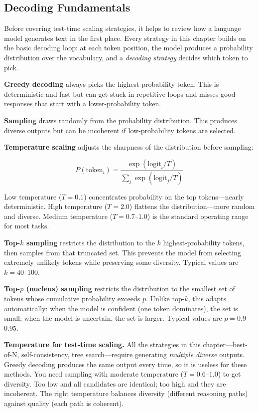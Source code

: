 \begin{chapterenv}
\section{Decoding Fundamentals}

Before covering test-time scaling strategies, it helps to review how a language model generates text in the first place. Every strategy in this chapter builds on the basic decoding loop: at each token position, the model produces a probability distribution over the vocabulary, and a \textit{decoding strategy} decides which token to pick.

\textbf{Greedy decoding} always picks the highest-probability token. This is deterministic and fast but can get stuck in repetitive loops and misses good responses that start with a lower-probability token.

\textbf{Sampling} draws randomly from the probability distribution. This produces diverse outputs but can be incoherent if low-probability tokens are selected.

\textbf{Temperature scaling} adjusts the sharpness of the distribution before sampling:

$$P(\text{token}_i) = \frac{\exp(\text{logit}_i / T)}{\sum_j \exp(\text{logit}_j / T)}$$

Low temperature ($T = 0.1$) concentrates probability on the top tokens---nearly deterministic. High temperature ($T = 2.0$) flattens the distribution---more random and diverse. Medium temperature ($T = 0.7$--$1.0$) is the standard operating range for most tasks.

\textbf{Top-$k$ sampling} restricts the distribution to the $k$ highest-probability tokens, then samples from that truncated set. This prevents the model from selecting extremely unlikely tokens while preserving some diversity. Typical values are $k = 40$--$100$.

\textbf{Top-$p$ (nucleus) sampling} restricts the distribution to the smallest set of tokens whose cumulative probability exceeds $p$. Unlike top-$k$, this adapts automatically: when the model is confident (one token dominates), the set is small; when the model is uncertain, the set is larger. Typical values are $p = 0.9$--$0.95$.

\begin{tipbox}
\textbf{Temperature for test-time scaling.} All the strategies in this chapter---best-of-N, self-consistency, tree search---require generating \textit{multiple diverse} outputs. Greedy decoding produces the same output every time, so it is useless for these methods. You need sampling with moderate temperature ($T = 0.6$--$1.0$) to get diversity. Too low and all candidates are identical; too high and they are incoherent. The right temperature balances diversity (different reasoning paths) against quality (each path is coherent).
\end{tipbox}


\end{chapterenv}
